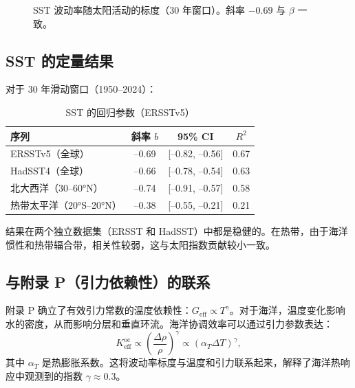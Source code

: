 \documentclass[12pt,a4paper]{article}
\newcommand{\Keff}{K_{\mathrm{eff}}}
\newcommand{\be}{\beta}
\newcommand{\ga}{\gamma}
\begin{document}
	\begin{figure}[htbp]
		\centering
		\caption{SST 波动率随太阳活动的标度（30 年窗口）。斜率 \(-0.69\) 与 \(\be\) 一致。}
		\label{fig:sst_scaling}
	\end{figure}
	
	\subsection{SST 的定量结果}
	
	对于 30 年滑动窗口（1950–2024）：
	
	\begin{table}[htbp]
		\centering
		\caption{SST 的回归参数（ERSSTv5）}
		\label{tab:sst_reg}
		\begin{tabular}{@{}lccc@{}}
			\toprule
			序列 & 斜率 \(b\) & 95\% CI & \(R^2\) \\
			\midrule
			ERSSTv5（全球） & –0.69 & [–0.82, –0.56] & 0.67 \\
			HadSST4（全球）  & –0.66 & [–0.78, –0.54] & 0.63 \\
			北大西洋（30–60°N） & –0.74 & [–0.91, –0.57] & 0.58 \\
			热带太平洋（20°S–20°N） & –0.38 & [–0.55, –0.21] & 0.21 \\
			\bottomrule
		\end{tabular}
	\end{table}
	
	结果在两个独立数据集（ERSST 和 HadSST）中都是稳健的。在热带，由于海洋惯性和热带辐合带，相关性较弱，这与太阳指数贡献较小一致。
	
	\subsection{与附录 P（引力依赖性）的联系}
	
	附录 P 确立了有效引力常数的温度依赖性：\(G_{\text{eff}} \propto T^{\ga}\)。对于海洋，温度变化影响水的密度，从而影响分层和垂直环流。海洋协调效率可以通过引力参数表达：
	\[
	\Keff^{\text{oc}} \propto \left( \frac{\Delta \rho}{\rho} \right)^{\ga} \propto (\alpha_T \Delta T)^{\ga},
	\]
	其中 \(\alpha_T\) 是热膨胀系数。这将波动率标度与温度和引力联系起来，解释了海洋热响应中观测到的指数 \(\ga \approx 0.3\)。
	
\end{document}
